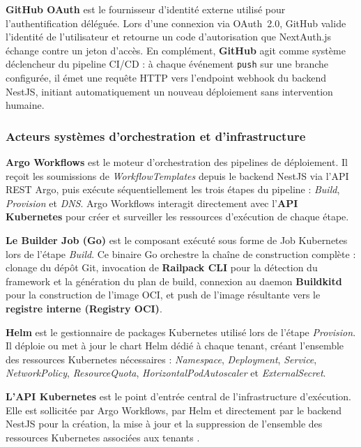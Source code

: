 \textbf{GitHub OAuth} est le fournisseur d'identité externe utilisé pour l'authentification déléguée. Lors d'une connexion via OAuth~2.0, GitHub valide l'identité de l'utilisateur et retourne un code d'autorisation que NextAuth.js échange contre un jeton d'accès. En complément, \textbf{GitHub} agit comme système déclencheur du pipeline CI/CD : à chaque événement \texttt{push} sur une branche configurée, il émet une requête HTTP vers l'endpoint webhook du backend NestJS, initiant automatiquement un nouveau déploiement sans intervention humaine.

\subsubsection*{Acteurs systèmes d'orchestration et d'infrastructure}

\textbf{Argo Workflows} est le moteur d'orchestration des pipelines de déploiement. Il reçoit les soumissions de \textit{WorkflowTemplates} depuis le backend NestJS via l'API REST Argo, puis exécute séquentiellement les trois étapes du pipeline : \textit{Build}, \textit{Provision} et \textit{DNS}. Argo Workflows interagit directement avec l'\textbf{API Kubernetes} pour créer et surveiller les ressources d'exécution de chaque étape.

\textbf{Le Builder Job (Go)} est le composant exécuté sous forme de Job Kubernetes lors de l'étape \textit{Build}. Ce binaire Go orchestre la chaîne de construction complète : clonage du dépôt Git, invocation de \textbf{Railpack CLI} pour la détection du framework et la génération du plan de build, connexion au daemon \textbf{Buildkitd} pour la construction de l'image OCI, et push de l'image résultante vers le \textbf{registre interne (Registry OCI)}.

\textbf{Helm} est le gestionnaire de packages Kubernetes utilisé lors de l'étape \textit{Provision}. Il déploie ou met à jour le chart Helm dédié à chaque tenant, créant l'ensemble des ressources Kubernetes nécessaires : \textit{Namespace}, \textit{Deployment}, \textit{Service}, \textit{NetworkPolicy}, \textit{ResourceQuota}, \textit{HorizontalPodAutoscaler} et \textit{ExternalSecret}.

\textbf{L'API Kubernetes} est le point d'entrée central de l'infrastructure d'exécution. Elle est sollicitée par Argo Workflows, par Helm et directement par le backend NestJS pour la création, la mise à jour et la suppression de l'ensemble des ressources Kubernetes associées aux tenants \cite{k8s-concepts}.

